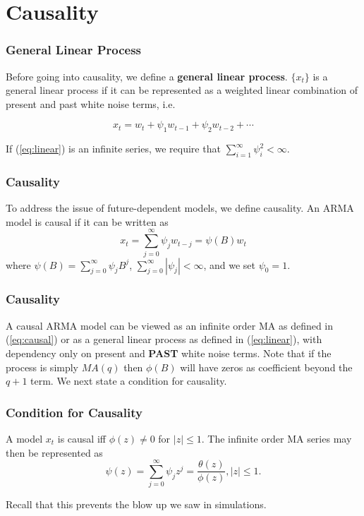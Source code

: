 \documentclass[%
xcolor=pdftex]{beamer}
\begin{document}
\section{Causality}
\frame{\tableofcontents[currentsection]}

\begin{frame}
\frametitle{General Linear Process}

Before going into causality, we define a \textbf{general linear process}. $\{x_t\}$ is a general linear process if it can be represented as a weighted linear combination of present and past white noise terms, i.e.

\begin{equation} \label{eq:linear}
x_t = w_t + \psi_1 w_{t-1} + \psi_2 w_{t-2} + \cdots
\end{equation}

If (\ref{eq:linear}) is an infinite series, we require that $\sum_{i=1}^{\infty} \psi_i^2 < \infty$.

\end{frame}


\begin{frame}
\frametitle{Causality}

To address the issue of future-dependent models, we define causality. An ARMA model is causal if it can be written as
\begin{equation} \label{eq:causal}
x_t=\sum_{j=0}^\infty \psi_j w_{t-j}=\psi(B) w_t
\end{equation}
where $\psi(B)=\sum_{j=0}^\infty \psi_j  B^j$, $\sum_{j=0}^\infty |\psi_j| < \infty$, and we set $\psi_0 = 1$.

\end{frame}


\begin{frame}
\frametitle{Causality}

A causal ARMA model can be viewed as an infinite order MA as defined in (\ref{eq:causal}) or as a general linear process as defined in (\ref{eq:linear}), with dependency
only on present and \textbf{PAST} white noise terms.   Note that if the process is
simply $MA(q)$ then $\phi(B)$ will have zeros as coefficient
beyond the $q+1$ term. We next state a condition for causality.


\end{frame}

\begin{frame}
\frametitle{Condition for Causality}

A model $x_t$ is causal iff  $\phi(z)\neq 0$ for $|z| \leq 1$.  The infinite order MA series may then be represented as
\begin{equation} \label{eq:causal_rep}
\psi(z)=\sum_{j=0}^\infty \psi_j z^j=\frac{\theta(z)}{\phi(z)},  |z| \leq 1.
\end{equation}

Recall that this prevents the blow up we saw in simulations.

\end{frame}
\end{document}
